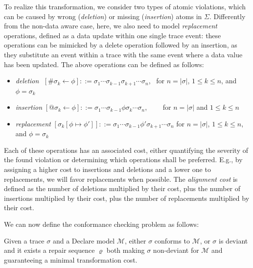 To realize this transformation, we consider two types of atomic violations, which can be caused by wrong (\textit{deletion}) or missing (\textit{insertion}) atoms in $\Sigma$. Differently from the non-data aware case, here, we also need to model \textit{replacement} operations, defined as a data update within one single trace event: these operations can be mimicked by a delete operation followed by an insertion, as they substitute an event within a trace with the same event where a data value has been updated. The above operations can be defined as follows:
\begin{itemize}
	\item \textit{deletion}\,\, $[\#\sigma_k\leftarrow \phi]::= \sigma_1\cdots\sigma_{k-1}\sigma_{k+1}\cdots \sigma_n$,\,\,\, for $n=|\sigma|$, $1\leq k\leq n$, and $\phi=\sigma_k$
	\item \textit{insertion} $[@\sigma_k\leftarrow \phi]::= \sigma_1\cdots\sigma_{k-1}\phi\sigma_{k}\cdots \sigma_n$,\,\,\,\,\,\,\,\,\,\,\,\, for $n=|\sigma|$ and $1\leq k\leq n$
	\item \textit{replacement} $[\sigma_k[\phi\mapsto\phi']]::=\sigma_1\cdots \sigma_{k-1}\phi'\sigma_{k+1}\cdots\sigma_n$ for $n=|\sigma|$, $1\leq k\leq n$, and $\phi=\sigma_k$
\end{itemize}
Each of these operations has an associated cost, either quantifying the severity of the found violation or determining which operations shall be preferred. E.g., by assigning a higher cost to insertions and deletions and a lower one to replacements, we will favor replacements when possible. The \textit{alignment cost} is defined as the number of deletions multiplied by their cost, plus the number of insertions multiplied by their cost, plus the number of replacements multiplied by their cost.

We can now define the conformance checking problem as follows:
\begin{definition}
Given a trace $\sigma$ and a Declare model $\mathcal{M}$, either $\sigma$ conforms to $\mathcal{M}$, or $\sigma$ is deviant and it exists a repair sequence $\varrho$ both making $\sigma$ non-deviant for $\mathcal{M}$ and guaranteeing a minimal transformation cost.
\end{definition}


